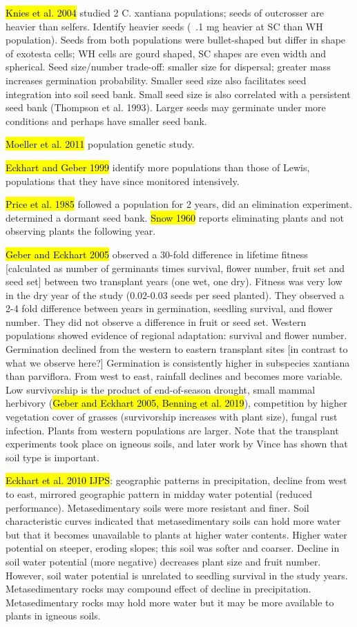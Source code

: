 \documentclass[12pt, oneside, titlepage]{article}   	%
\begin{document}
{\hl{Knies et al. 2004} studied 2 C. xantiana populations; seeds of outcrosser are heavier than selfers. Identify heavier seeds (~.1 mg heavier at SC than WH population). Seeds from both populations were bullet-shaped but differ in shape of exotesta cells; WH cells are gourd shaped, SC shapes are even width and spherical. Seed size/number trade-off: smaller size for dispersal; greater mass increases germination probability. Smaller seed size also facilitates seed integration into soil seed bank. Small seed size is also correlated with a persistent seed bank (Thompson et al. 1993). Larger seeds may germinate under more conditions and perhaps have smaller seed bank.

\hl{Moeller et al. 2011} population genetic study. 

\hl{Eckhart and Geber 1999} identify more populations than those of Lewis, populations that they have since monitored intensively. 

\hl{Price et al. 1985} followed a population for 2 years, did an elimination experiment. determined a dormant seed bank.  \hl{Snow 1960} reports eliminating plants and not observing plants the following year. 

\hl{Geber and Eckhart 2005} observed a 30-fold difference in lifetime fitness [calculated as number of germinants times survival, flower number, fruit set and seed set] between two transplant years (one wet, one dry). Fitness was very low in the dry year of the study (0.02-0.03 seeds per seed planted). They observed a 2-4 fold difference between years in germination, seedling survival, and flower number. They did not observe a difference in fruit or seed set. Western populations showed evidence of regional adaptation: survival and flower number. Germination declined from the western to eastern transplant sites [in contrast to what we observe here?] Germination is consistently higher in subspecies xantiana than parviflora. From west to east, rainfall declines and becomes more variable. Low survivorship is the product of end-of-season drought, small mammal herbivory (\hl{Geber and Eckhart 2005, Benning et al. 2019}), competition by higher vegetation cover of grasses (survivorship increases with plant size), fungal rust infection. Plants from western populations are larger. Note that the transplant experiments took place on igneous soils, and later work by Vince has shown that soil type is important. 

\hl{Eckhart et al. 2010 IJPS}: geographic patterns in precipitation, decline from west to east, mirrored geographic pattern in midday water potential (reduced performance). Metasedimentary soils were more resistant and finer. Soil characteristic curves indicated that metasedimentary soils can hold more water but that it becomes unavailable to plants at higher water contents. Higher water potential on steeper, eroding slopes; this soil was softer and coarser. Decline in soil water potential (more negative) decreases plant size and fruit number. However, soil water potential is unrelated to seedling survival in the study years. Metasedimentary rocks may compound effect of decline in precipitation. Metasedimentary rocks may hold more water but it may be more available to plants in igneous soils. 

}
\end{document}
